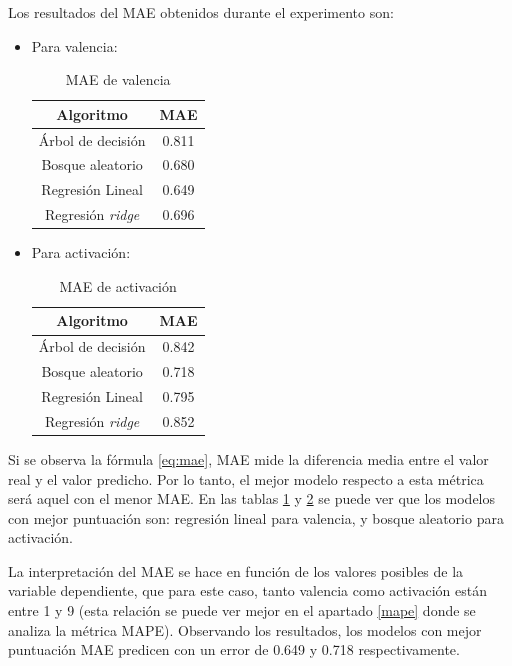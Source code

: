 \documentclass[12pt,a4paper]{article}
\begin{document}
Los resultados del MAE obtenidos durante el experimento son:
\begin{itemize}
	\item Para valencia:
	\begin{table}[H]
		\centering
		\caption{MAE de valencia}
		\label{tab:maevalencia}
		\begin{tabular}{|c|c|}
			\hline
			\textbf{Algoritmo} & \textbf{MAE} \\
			\hline
			Árbol de decisión & 0.811 \\
			Bosque aleatorio & 0.680 \\
			Regresión Lineal & 0.649 \\
			Regresión \textit{ridge} & 0.696 \\
			\hline
		\end{tabular}
	\end{table}
	\item Para activación:
	\begin{table}[H]
		\centering
		\caption{MAE de activación}
		\label{tab:maeactivacion}
		\begin{tabular}{|c|c|}
			\hline
			\textbf{Algoritmo} & \textbf{MAE} \\
			\hline
			Árbol de decisión & 0.842 \\
			Bosque aleatorio & 0.718 \\
			Regresión Lineal & 0.795 \\
			Regresión \textit{ridge} & 0.852 \\
			\hline
		\end{tabular}
	\end{table}
\end{itemize}

Si se observa la fórmula \eqref{eq:mae}, MAE mide la diferencia media entre el valor real y el valor predicho. Por lo tanto, el mejor modelo respecto a esta métrica será aquel con el menor MAE. En las tablas \ref{tab:maevalencia} y \ref{tab:maeactivacion} se puede ver que los modelos con mejor puntuación son: regresión lineal para valencia, y bosque aleatorio para activación.


La interpretación del MAE se hace en función de los valores posibles de la variable dependiente, que para este caso, tanto valencia como activación están entre 1 y 9 (esta relación se puede ver mejor en el apartado \ref{mape} donde se analiza la métrica MAPE). Observando los resultados, los modelos con mejor puntuación MAE predicen con un error de 0.649 y 0.718 respectivamente.
\end{document}

